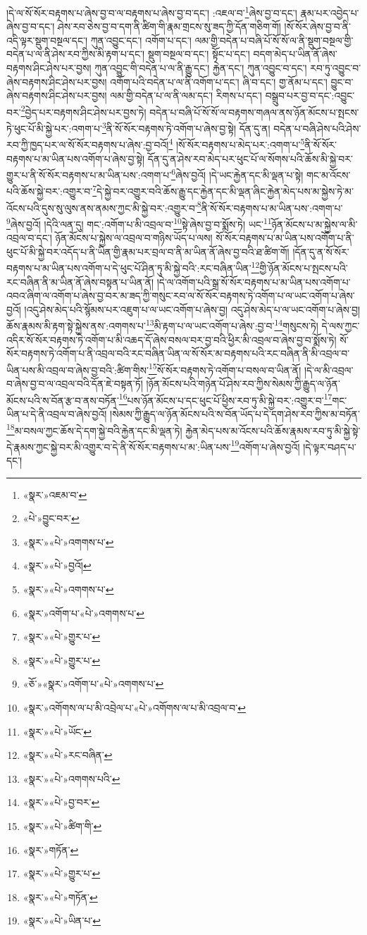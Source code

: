 །དེ་ལ་སོ་སོར་བརྟགས་པ་ཞེས་བྱ་བ་ལ་བརྟགས་པ་ཞེས་བྱ་བ་དང་། :འཇལ་བ་\footnote{«སྣར་»འཇམ་བ་}ཞེས་བྱ་བ་དང་། རྣམ་པར་འབྱེད་པ་ཞེས་བྱ་བ་དང་། ཤེས་རབ་ཅེས་བྱ་བ་དག་ནི་ཚིག་གི་རྣམ་གྲངས་སུ་ཟད་ཀྱི་དོན་གཅིག་གོ། །སོ་སོར་ཞེས་བྱ་བ་ནི་འདི་ལྟར་སྡུག་བསྔལ་དང་། ཀུན་འབྱུང་དང་། འགོག་པ་དང་། ལམ་གྱི་བདེན་པ་བཞི་པོ་སོ་སོ་ལ་ནི་སྡུག་བསྔལ་གྱི་བདེན་པ་ལ་ནི་ཤེས་རབ་ཀྱིས་མི་རྟག་པ་དང་། སྡུག་བསྔལ་བ་དང་། སྟོང་པ་དང་། བདག་མེད་པ་ཡིན་ནོ་ཞེས་བརྟགས་ཤིང་ཤེས་པར་བྱས། ཀུན་འབྱུང་གི་བདེན་པ་ལ་ནི་རྒྱུ་དང་། རྐྱེན་དང་། ཀུན་འབྱུང་བ་དང་། རབ་ཏུ་འབྱུང་བ་ཞེས་བརྟགས་ཤིང་ཤེས་པར་བྱས། འགོག་པའི་བདེན་པ་ལ་ནི་འགོག་པ་དང་། ཞི་བ་དང་། གྱ་ནོམ་པ་དང་། བྱུང་བ་ཞེས་བརྟགས་ཤིང་ཤེས་པར་བྱས། ལམ་གྱི་བདེན་པ་ལ་ནི་ལམ་དང་། རིགས་པ་དང་། བསྒྲུབ་པར་བྱ་བ་དང་:འབྱུང་བར་\footnote{«པེ་»བྱུང་བར་}བྱེད་པར་བརྟགས་ཤིང་ཤེས་པར་བྱས་ཏེ། བདེན་པ་བཞི་པོ་སོ་སོ་ལ་བརྟགས་གཞལ་ནས་ཉོན་མོངས་པ་སྤངས་ཏེ་ཕུང་པོ་མི་སྐྱེ་པར་:འགག་པ་\footnote{«སྣར་»«པེ་»འགགས་པ་}ནི་སོ་སོར་བརྟགས་ཏེ་འགོག་པ་ཞེས་བྱ་སྟེ། དོན་དུ་ན། བདེན་པ་བཞི་ཤེས་པའི་ཤེས་རབ་ཀྱི་ཁྱད་པར་ལ་སོ་སོར་བརྟགས་པ་ཞེས་:བྱ་བའོ།\footnote{«སྣར་»«པེ་»བྱའོ།} །སོ་སོར་བརྟགས་པ་མེད་པར་:འགག་པ་\footnote{«སྣར་»«པེ་»འགགས་པ་}ནི་སོ་སོར་བརྟགས་པ་མ་ཡིན་པས་འགོག་པ་ཞེས་བྱ་སྟེ། དོན་དུ་ན་ཤེས་རབ་མེད་པར་ཕུང་པོ་ལ་སོགས་པའི་ཆོས་མི་སྐྱེ་བར་གྱུར་པ་ནི་སོ་སོར་བརྟགས་པ་མ་ཡིན་པས་:འགག་པ་\footnote{«སྣར་»འགོག་པ་«པེ་»འགགས་པ་}ཞེས་བྱའོ། །དེ་ཡང་རྐྱེན་དང་མི་ལྡན་པ་སྟེ། གང་མ་འོངས་པའི་ཆོས་སྐྱེ་བར་:འགྱུར་བ་\footnote{«སྣར་»«པེ་»གྱུར་པ་}དེ་སྐྱེ་བར་འགྱུར་བའི་ཆོས་རྒྱུ་དང་རྐྱེན་དང་མི་ལྡན་ཞིང་རྐྱེན་མེད་པས་མ་སྐྱེས་ཏེ་མ་འོངས་པའི་དུས་སུ་ལུས་ནས་ནམས་ཀྱང་མི་སྐྱེ་བར་:འགྱུར་བ་\footnote{«སྣར་»«པེ་»གྱུར་པ་}ནི་སོ་སོར་བརྟགས་པ་མ་ཡིན་པས་:འགག་པ་\footnote{«ཅོ་»«སྣར་»འགོག་པ་«པེ་»འགགས་པ་}ཞེས་བྱའོ། །དེའི་ལན་དུ། གང་:འགོག་པ་མི་འབྲལ་བ་\footnote{«སྣར་»འགོགས་ལ་པ་མི་འབྲེལ་པ་«པེ་»འགོགས་ལ་པ་མི་འབྲལ་བ་}སྟེ་ཞེས་བྱ་བ་སྨོས་ཏེ། ཡང་\footnote{«སྣར་»«པེ་»ཡོང་}ཉོན་མོངས་པ་མ་སྐྱེས་ལ་མི་འབྲལ་བ་དང་། ཉོན་མོངས་པ་སྐྱེས་ལ་འབྲལ་བ་གཉིས་ཡོད་པ་ལས། སོ་སོར་བརྟགས་པ་མ་ཡིན་པས་འགོག་པ་ནི་ཕུང་པོ་མི་སྐྱེ་བར་འདོད་པ་ནི་ཡིན་གྱི་རྣམ་པར་བྲལ་བ་ནི་མ་ཡིན་ནོ་ཞེས་བྱ་བའི་ཐ་ཚིག་གོ། །དོན་དུ་ན་སོ་སོར་བརྟགས་པ་མ་ཡིན་པས་འགོག་པ་དེ་ཕུང་པོ་ཤིན་ཏུ་མི་སྐྱེ་བའི་:རང་བཞིན་ཡིན་\footnote{«སྣར་»«པེ་»རང་བཞིན་}གྱི་ཉོན་མོངས་པ་སྤངས་པའི་རང་བཞིན་ནི་མ་ཡིན་ནོ་ཞེས་བསྟན་པ་ཡིན་ནོ། །དེ་ལ་འགོག་པའི་སྒྲ་སོ་སོར་བརྟགས་པ་མ་ཡིན་པས་འགོག་པ་འབའ་ཞིག་ལ་འགོག་པ་ཞེས་བྱ་བར་མ་ཟད་ཀྱི་གསུང་རབ་ལ་སོ་སོར་བརྟགས་ཏེ་འགོག་པ་ལ་ཡང་འགོག་པ་ཞེས་བྱའོ། །འདུ་ཤེས་མེད་པའི་སྙོམས་པར་འཇུག་པ་ལ་ཡང་འགོག་པ་ཞེས་བྱ། འདུ་ཤེས་མེད་པ་ལ་ཡང་འགོག་པ་ཞེས་བྱ། ཆོས་རྣམས་མི་རྟག་སྟེ་སྐྱེས་ནས་:འགགས་པ་\footnote{«སྣར་»«པེ་»འགགས་པའི་}མི་རྟག་པ་ལ་ཡང་འགོག་པ་ཞེས་:བྱ་བ་\footnote{«སྣར་»«པེ་»བྱ་བར་}གསུངས་ཏེ། དེ་ལས་ཀྱང་འདིར་སོ་སོར་བརྟགས་ཏེ་འགོག་པ་མི་འཆད་དོ་ཞེས་བསལ་བར་བྱ་བའི་ཕྱིར་མི་འབྲལ་བ་ཞེས་བྱ་བ་སྨོས་ཏེ། སོ་སོར་བརྟགས་ཏེ་འགོག་པ་ནི་འབྲལ་བའི་རང་བཞིན་ཡིན་ལ་སོ་སོར་མ་བརྟགས་པའི་རང་བཞིན་ནི་མི་འབྲལ་བ་ཡིན་པས་མི་འབྲལ་བ་ཞེས་བྱ་བའི་:ཚིག་གིས་\footnote{«སྣར་»«པེ་»ཚིག་གི་}སོ་སོར་བརྟགས་ཏེ་འགོག་པ་བསལ་བ་ཡིན་ནོ། །དེ་ལ་མི་འབྲལ་བ་ཞེས་བྱ་བ་ལ་འབྲལ་བའི་དོན་ཇེ་བསྟན་ཏོ། །ཉོན་མོངས་པའི་གཉེན་པོ་ཤེས་རབ་ཀྱིས་སེམས་ཀྱི་རྒྱུད་ལ་ཉོན་མོངས་པའི་ས་བོན་རྩ་བ་ནས་བཏོན་\footnote{«སྣར་»གཏོན་}པས་ཉོན་མོངས་པ་དང་ཕུང་པོ་ཕྱིས་རབ་ཏུ་མི་སྐྱེ་བར་:འགྱུར་བ་\footnote{«སྣར་»«པེ་»གྱུར་པ་}གང་ཡིན་པ་དེ་ནི་འབྲལ་བ་ཞེས་བྱའོ། །སེམས་ཀྱི་རྒྱུད་ལ་ཉོན་མོངས་པའི་ས་བོན་ཡོད་པ་དེ་དག་ཤེས་རབ་ཀྱིས་མ་བཏོན་\footnote{«སྣར་»«པེ་»གཏོན་}མ་བསལ་ཀྱང་ཆོས་དེ་དག་སྐྱེ་བའི་རྐྱེན་དང་མི་ལྡན་ཏེ། རྐྱེན་མེད་པས་མ་འོངས་པའི་ཆོས་རྣམས་རབ་ཏུ་མི་སྐྱེ་སྟེ་དེ་རྣམས་ཀྱང་སྐྱེ་བར་མི་འགྱུར་བ་དེ་ནི་སོ་སོར་བརྟགས་པ་མ་:ཡིན་པས་\footnote{«སྣར་»«པེ་»ཡིན་པ་}འགོག་པ་ཞེས་བྱའོ། །དེ་ལྟར་བཤད་པ་དང་། 